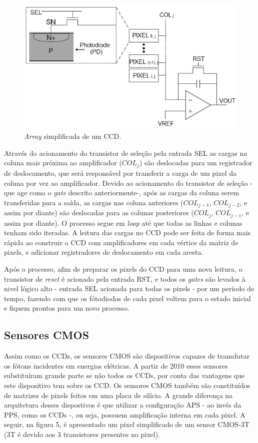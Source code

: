 \documentclass[10pt,a4paper,twocolumn]{article}
\begin{document}
	\begin{figure}[H]
	\centering
	\includegraphics[scale=0.56]{imagens/passive-pixel.jpg}
	\caption{\textit{Array} simplificada de um CCD.}
	\end{figure}
	
	Através do acionamento do transistor de seleção pela entrada SEL as cargas na coluna mais próxima ao amplificador ($COL_{j}$) são deslocadas para um registrador de deslocamento, que será responsável por transferir a carga de um pixel da coluna por vez ao amplificador. Devido ao acionamento do transistor de seleção - que age como o \textit{gate} descrito anteriormente-, após as cargas da coluna serem transferidas para a saída, as cargas nas coluna anteriores ($COL_{j-1}$, $COL_{j-2}$, e assim por diante) são deslocadas para as colunas posteriores ($COL_{j}$, $COL_{j-1}$, e assim por diante). O processo segue em \textit{loop} até que todas as linhas e colunas tenham sido iteradas. A leitura das cargas no CCD pode ser feita de forma mais rápida ao construir o CCD com amplificadores em cada vértice da matriz de pixels, e adicionar registradores de deslocamento em cada aresta.
	
	Após o processo, afim de preparar os pixels do CCD para uma nova leitura, o transistor de \textit{reset} é acionado pela entrada RST, e todos os \textit{gates} são levados à nivel lógico alto - entrada SEL acionada para todas os pixels - por um período de tempo, fazendo com que os fótodiodos de cada pixel voltem para o estado inicial e fiquem prontos para um novo processo.
	
	\subsection*{Sensores CMOS}
	Assim  como os CCDs, os sensores CMOS são dispositivos capazes de transdutar os fótons incidentes em energias elétricas. A partir de 2010 esses sensores substituíram grande parte se não todos os CCDs, por conta das vantagens que este dispositivo tem sobre os CCD. Os sensores CMOS também são constituídos de matrizes de pixels feitos em uma placa de silício. A grande diferença na arquitetura desses dispostivos é que utilizar a configuração APS - ao invés da PPS, como os CCDs -, ou seja, possuem amplificação interna em cada pixel. A seguir, na figura 5, é apresentado um pixel simplificado de um sensor CMOS-3T (3T é devido aos 3 transistores presentes no pixel).
	
\end{document}
